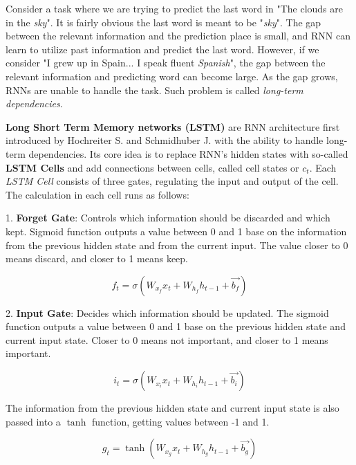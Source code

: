 Consider a task where we are trying to predict the last word in "The clouds are in the \textit{sky}". It is fairly obvious the last word is meant to be "\textit{sky}". The gap between the relevant information and the prediction place is small, and RNN can learn to utilize past information and predict the last word. However, if we consider "I grew up in Spain... I speak fluent \textit{Spanish}", the gap between the relevant information and predicting word can become large. As the gap grows, RNNs are unable to handle the task. Such problem is called \textit{long-term dependencies}.\cite{colahLSTM}

\textbf{Long Short Term Memory networks (LSTM)} are RNN architecture first introduced by Hochreiter S. and Schmidhuber J. \cite{hochreiterLSTM} with the ability to handle long-term dependencies. Its core idea is to replace RNN's hidden states with so-called \textbf{LSTM Cells} and add connections between cells, called cell states or $c_{t}$. Each \textit{LSTM Cell} consists of three gates, regulating the input and output of the cell. The calculation in each cell runs as follows:

1. \textbf{Forget Gate}: Controls which information should be discarded and which kept. Sigmoid function outputs a value between 0 and 1 base on the information from the previous hidden state and from the current input. The value closer to 0 means discard, and closer to 1 means keep.

\begin{equation}
    {f_t = \sigma(W_{x_f}x_t + W_{h_f}h_{t-1}+\vec{b_f})}
\end{equation}

2. \textbf{Input Gate}: Decides which information should be updated. The sigmoid function outputs a value between 0 and 1 base on the previous hidden state and current input state. Closer to 0 means not important, and closer to 1 means important.

\begin{equation}
    {i_t = \sigma(W_{x_i}x_t + W_{h_i}h_{t-1}+\vec{b_i})}
\end{equation}

The information from the previous hidden state and current input state is also passed into a $\tanh$ function, getting values between -1 and 1.

\begin{equation}
    {g_t = \tanh(W_{x_g}x_t + W_{h_g}h_{t-1}+\vec{b_g})}
\end{equation}

